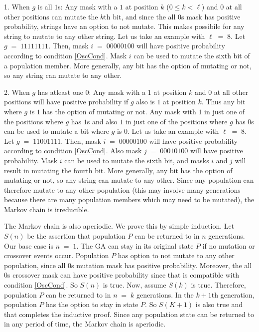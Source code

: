 1. When $g$ is all $1$s:\newline
Any mask with a $1$ at position $k$ ($0 \leq k < \ell$) and $0$ at all other positions can mutate the $k$th bit, and since the 
all $0$s mask has positive probability, strings have an option to not mutate. This makes possibile for any string to mutate to 
any other string. Let us take an example with $\ell \;=\; 8$. Let $g \;=\; 11111111$. Then, mask 
$i \;=\; 00000100$ will have positive probability according to condition \ref{OscCond}. 
Mask $i$ can be used to mutate the sixth bit of a population member. More generally, 
any bit has the option of mutating or not, so any string can mutate to any other.

2. When $g$ has atleast one $0$:\newline
Any mask with a $1$ at position $k$ and $0$ at all other positions  
will have positive probability if $g$ also is $1$ at position $k$. Thus any bit where $g$ is $1$ has the option of mutating or not.  
Any mask with $1$ in just one of the positions where $g$ has $1$s and also $1$ in just one of the positions where $g$ has $0$s can be used to 
mutate a bit where $g$ is $0$. Let us take an example with $\ell \;=\; 8$. Let $g \;=\; 11001111$. Then, 
mask $i \;=\; 00000100$ will have positive probability according to condition \ref{OscCond}. Also mask 
$j \;=\; 00010100$ will have positive probability. Mask $i$ can be used to mutate the sixth bit, and masks $i$ and $j$ will result in mutating
the fourth bit. More generally, any bit has the option of mutating or not, so any string can mutate to any other. Since any population can therefore 
mutate to any other population (this may involve many generations because there are many population members which may need to be mutated), the Markov 
chain is irreducible.

The Markov chain is also aperiodic. We prove this by simple induction. 
Let $S(n)$ be the assertion that population $P$ can be returned to in $n$ generations. 
Our base case is $n \;=\; 1$. The GA can stay in its original state $P$ if no mutation or crossover events occur. 
Population $P$ has option to not mutate to any other population, since all $0$s mutation mask 
has positive probability. Moreover, the all $0$s crossover mask can have positive probability since 
that is compatible with condition \ref{OscCond}.
So $S(n)$ is true. Now, assume $S(k)$ is true. Therefore, population $P$ can be returned to in $n \;= \;k$ generations. 
In the $k+1$th generation, population $P$ has the option to stay in state $P$. 
So $S(K+1)$ is also true and that completes the inductive proof. 
Since any population state can be returned to in any period of time, the Markov chain is aperiodic. 

